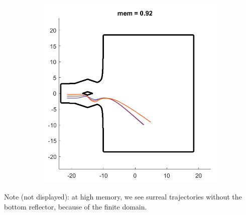 \documentclass[compress,10pt,usenames,dvipsnames]{beamer}
\theoremstyle{remark}
\begin{document}
\begin{frame}
\begin{figure}
\begin{subfigure}[t]{.33\textwidth}
		\end{subfigure}%
		\begin{subfigure}[t]{.33\textwidth}
			\centering
			\includegraphics[scale=0.25]{Figures/mem3.png}
		\end{subfigure}
	\end{figure}
\bigskip
Note (not displayed): at high memory, we see surreal trajectories without the bottom reflector, because of the finite domain.
\end{frame}
\end{document}
